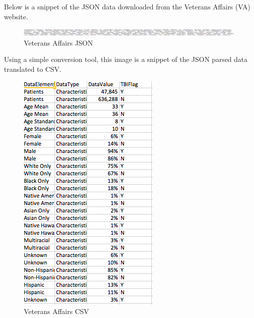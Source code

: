 \documentclass[sigconf]{acmart}
\begin{document}
Below is a snippet of the JSON data downloaded from the Veterans Affairs (VA) website.  


\begin{figure}[h]
\includegraphics[width=\columnwidth]{images/graph2.png}
\caption{Veterans Affairs JSON}\label{f:Veterans Affairs JSON}
\end{figure}

Using a simple conversion tool, this image is a snippet of the JSON parsed data translated to CSV.

\begin{figure}[h]
\includegraphics[width=\columnwidth]{images/graph3.png}
\caption{Veterans Affairs CSV}\label{f:Veterans Affairs CSV}
\end{figure}
\end{document}
